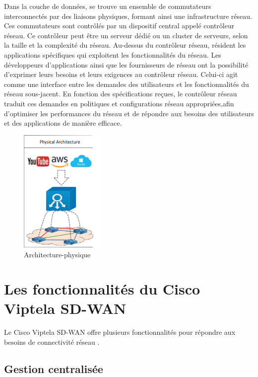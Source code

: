 Dans la couche de données, se trouve un ensemble de commutateurs interconnectés par des liaisons physiques, formant ainsi une infrastructure réseau. Ces commutateurs sont contrôlés par un dispositif central appelé contrôleur réseau. Ce contrôleur peut être un serveur dédié ou un cluster de serveurs, selon la taille et la complexité du réseau. Au-dessus du contrôleur réseau, résident les applications spécifiques qui exploitent les fonctionnalités du réseau.
Les développeurs d'applications ainsi que les fournisseurs de réseau ont la possibilité d'exprimer leurs besoins et leurs exigences au contrôleur réseau. Celui-ci agit comme une interface entre les demandes des utilisateurs et les fonctionnalités du réseau sous-jacent. En fonction des spécifications reçues, le contrôleur réseau traduit ces demandes en politiques et configurations réseau appropriées,afin d'optimiser les performances du réseau et de répondre aux besoins des utilisateurs et des applications de manière efficace. 
\begin{figure} [H]
	\begin{center}
		\centering
		\hspace*{-0.5cm}
		\includegraphics[height=6cm]{../image/arch phy}
	\end{center}
	\caption{Architecture-physique}
\end{figure} 

\section{Les fonctionnalités du Cisco Viptela SD-WAN }

Le Cisco Viptela SD-WAN offre  plusieurs fonctionnalités pour répondre aux besoins de connectivité réseau .
\subsection{Gestion centralisée  }


